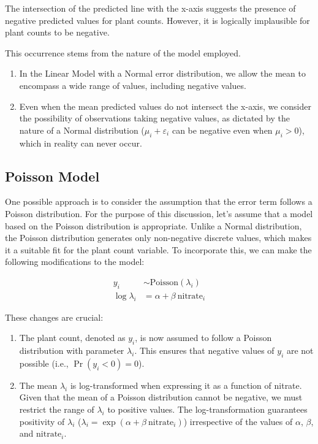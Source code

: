 \documentclass[
]{book}
\providecommand{\tightlist}{%
  \setlength{\itemsep}{0pt}\setlength{\parskip}{0pt}}
\begin{document}
The intersection of the predicted line with the x-axis suggests the presence of negative predicted values for plant counts. However, it is logically implausible for plant counts to be negative.

This occurrence stems from the nature of the model employed.

\begin{enumerate}
\def\labelenumi{\arabic{enumi}.}
\tightlist
\item
  In the Linear Model with a Normal error distribution, we allow the mean to encompass a wide range of values, including negative values.
\item
  Even when the mean predicted values do not intersect the x-axis, we consider the possibility of observations taking negative values, as dictated by the nature of a Normal distribution (\(\mu_i + \varepsilon_i\) can be negative even when \(\mu_i > 0\)), which in reality can never occur.
\end{enumerate}

\hypertarget{poisson-model}{%
\subsection{Poisson Model}\label{poisson-model}}

One possible approach is to consider the assumption that the error term follows a Poisson distribution. For the purpose of this discussion, let's assume that a model based on the Poisson distribution is appropriate. Unlike a Normal distribution, the Poisson distribution generates only non-negative discrete values, which makes it a suitable fit for the plant count variable. To incorporate this, we can make the following modifications to the model:

\[
\begin{aligned}
y_i &\sim \text{Poisson}(\lambda_i)\\
\log\lambda_i &= \alpha + \beta~\text{nitrate}_i
\end{aligned}
\]

These changes are crucial:

\begin{enumerate}
\def\labelenumi{\arabic{enumi}.}
\tightlist
\item
  The plant count, denoted as \(y_i\), is now assumed to follow a Poisson distribution with parameter \(\lambda_i\). This ensures that negative values of \(y_i\) are not possible (i.e., \(\Pr(y_i < 0) = 0\)).
\item
  The mean \(\lambda_i\) is log-transformed when expressing it as a function of nitrate. Given that the mean of a Poisson distribution cannot be negative, we must restrict the range of \(\lambda_i\) to positive values. The log-transformation guarantees positivity of \(\lambda_i\) (\(\lambda_i = \exp(\alpha + \beta~\text{nitrate}_i)\)) irrespective of the values of \(\alpha\), \(\beta\), and \(\text{nitrate}_i\).
\end{enumerate}
\end{document}
